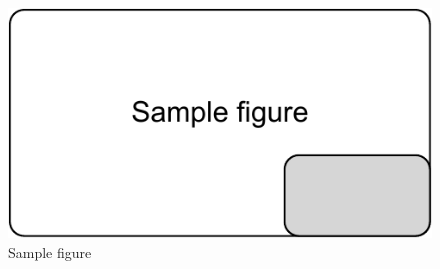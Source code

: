 \documentclass[10pt,sigconf]{acmart}
\begin{document}
\begin{figure}[htbp]
  \centering
  \includegraphics[scale=0.5]{sample-figure}
  \caption{Sample figure}
  \label{fig:sample}
\end{figure}





 
\end{document}
